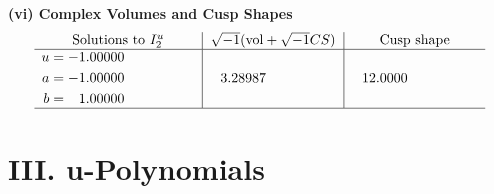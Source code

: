 \documentclass[1p]{elsarticle_modified}
\theoremstyle{definition}
\newcommand{\I}{\sqrt{-1}}
\begin{document}
\newpage\flushleft \textbf{(vi) Complex Volumes and Cusp Shapes}
$$\begin{array}{c|c|c}  
\text{Solutions to }I^u_{2}& \I (\text{vol} + \sqrt{-1}CS) & \text{Cusp shape}\\
 \hline 
\begin{aligned}
u &= -1.00000\phantom{ +0.000000I} \\
a &= -1.00000\phantom{ +0.000000I} \\
b &= \phantom{-}1.00000\phantom{ +0.000000I}\end{aligned}
 & \phantom{-}3.28987\phantom{ +0.000000I} & \phantom{-}12.0000\phantom{ +0.000000I}\\
 \hline 
 \end{array}$$\newpage
\newpage\renewcommand{\arraystretch}{1}
\centering \section*{ III. u-Polynomials}
\end{document}
